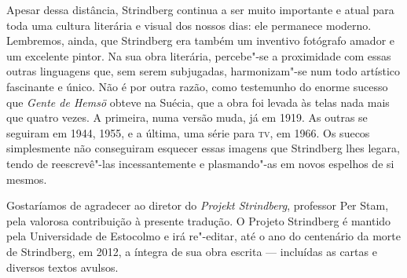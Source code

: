Apesar dessa distância, Strindberg continua a ser muito importante e atual
para toda uma cultura literária e visual dos nossos dias: ele permanece
moderno. Lembremos, ainda, que Strindberg era também um inventivo fotógrafo amador
e um excelente pintor. Na sua obra literária, percebe"-se a proximidade com 
essas outras linguagens que, sem serem subjugadas, harmonizam"-se num todo
artístico fascinante e único. Não é por outra razão, como testemunho do enorme sucesso
que \textit{Gente de Hemsö} obteve na Suécia, que a obra foi levada às telas nada mais
que quatro vezes.  A primeira, numa versão muda, já em 1919. As outras se
seguiram em 1944, 1955, e a última, uma série para \textsc{tv}, em 1966. 
Os suecos simplesmente não conseguiram esquecer essas imagens que
Strindberg lhes legara, tendo de reescrevê"-las incessantemente e 
plasmando"-as em novos espelhos de si mesmos. 



\asterisc

Gostaríamos de agradecer ao diretor do \textit{Projekt Strindberg}, professor
Per Stam, pela valorosa contribuição à presente tradução. O Projeto
Strindberg é mantido pela Universidade de Estocolmo e irá re"-editar,
até o ano do centenário da morte de Strindberg, em 2012, a íntegra de
sua obra escrita --- incluídas as cartas e diversos textos avulsos. 




